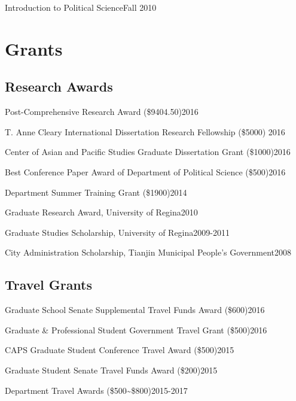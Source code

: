 \documentclass[10.5pt,]{article}
\providecommand{\tightlist}{%
  \setlength{\itemsep}{0pt}\setlength{\parskip}{0pt}}
\renewenvironment{itemize}{
  \begin{list}{}{
    \setlength{\leftmargin}{1.5em}
  }
}{
  \end{list}
}
\begin{document}
\begin{itemize}
\tightlist
\item
  Introduction to Political Science\hfill Fall 2010
\end{itemize}

\section{Grants}\label{grants}

\subsection{Research Awards}\label{research-awards}

\begin{itemize}
\tightlist
\item
  Post-Comprehensive Research Award (\$9404.50)\hfill 2016
\item
  T. Anne Cleary International Dissertation Research Fellowship (\$5000)
  \hfill 2016
\item
  Center of Asian and Pacific Studies Graduate Dissertation Grant
  (\$1000)\hfill 2016
\item
  Best Conference Paper Award of Department of Political Science
  (\$500)\hfill 2016
\item
  Department Summer Training Grant (\$1900)\hfill 2014
\item
  Graduate Research Award, University of Regina\hfill 2010
\item
  Graduate Studies Scholarship, University of Regina\hfill 2009-2011
\item
  City Administration Scholarship, Tianjin Municipal People's
  Government\hfill 2008
\end{itemize}

\subsection{Travel Grants}\label{travel-grants}

\begin{itemize}
\tightlist
\item
  Graduate School Senate Supplemental Travel Funds Award
  (\$600)\hfill 2016
\item
  Graduate \& Professional Student Government Travel Grant
  (\$500)\hfill 2016
\item
  CAPS Graduate Student Conference Travel Award (\$500)\hfill 2015
\item
  Graduate Student Senate Travel Funds Award (\$200)\hfill 2015
\item
  Department Travel Awards (\$500\textasciitilde{}\$800)\hfill 2015-2017
\end{itemize}
\end{document}
